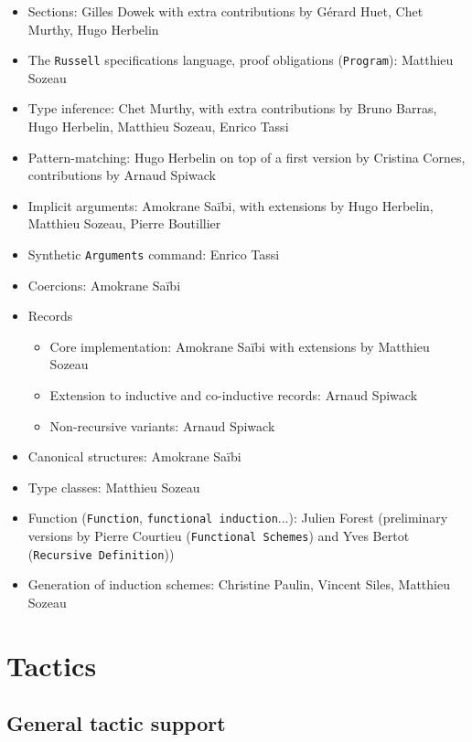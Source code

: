 \documentclass{article}
\begin{document}
\begin{itemize}
\item Sections: Gilles Dowek with extra contributions by Gérard
  Huet, Chet Murthy, Hugo Herbelin
\item The \texttt{Russell} specifications language, proof obligations (\texttt{Program}): Matthieu Sozeau
\item Type inference: Chet Murthy, with extra contributions by Bruno
  Barras, Hugo Herbelin, Matthieu Sozeau, Enrico Tassi
\item Pattern-matching: Hugo Herbelin on top of a first version by
  Cristina Cornes, contributions by Arnaud Spiwack
\item Implicit arguments: Amokrane Saïbi, with extensions by Hugo
  Herbelin, Matthieu Sozeau, Pierre Boutillier
\item Synthetic {\tt Arguments} command: Enrico Tassi
\item Coercions: Amokrane Saïbi
\item Records
  \begin{itemize}
  \item Core implementation: Amokrane Saïbi with extensions by Matthieu Sozeau
  \item Extension to inductive and co-inductive records: Arnaud Spiwack
  \item Non-recursive variants: Arnaud Spiwack
  \end{itemize}
\item Canonical structures: Amokrane Saïbi
\item Type classes: Matthieu Sozeau
\item Function (\texttt{Function}, \texttt{functional induction}...):
  Julien Forest (preliminary versions by Pierre Courtieu
  (\texttt{Functional Schemes}) and Yves Bertot (\texttt{Recursive
    Definition}))
\item Generation of induction schemes: Christine Paulin, Vincent
  Siles, Matthieu Sozeau
 \end{itemize}

\section{Tactics}

\subsection{General tactic support}
\end{document}
